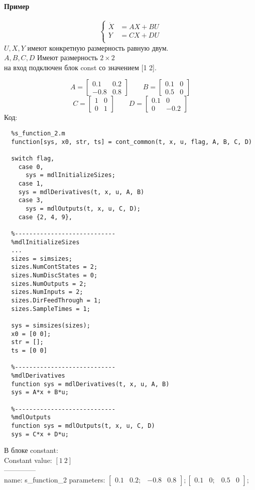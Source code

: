 \paragraph{Пример}\mbox{}\par
\[
  \left\{\begin{aligned} 
    \dot X &= AX + BU \\
    Y &= CX + DU \\
  \end{aligned}\right. 
\] 
$U, X, Y$ имеют конкретную размерность равную двум.\\
$A, B, C, D$ Имеют размерность $2 \times 2$ \\
на вход подключен блок const со значением [1 2].
\begin{figure}
  \centering
\end{figure}
\[
  A = \begin{bmatrix} 0.1 & 0.2 \\ -0.8 & 0.8 \end{bmatrix} \qquad
  B =\begin{bmatrix} 0.1 & 0 \\ 0.5 & 0 \end{bmatrix} 
\] 
\[
  C = \begin{bmatrix} 1 & 0 \\ 0 & 1  \end{bmatrix} \qquad
  D = \begin{bmatrix} 0.1 & 0 \\ 0 & -0.2 \end{bmatrix} 
\] 
Код:
\begin{verbatim}
  %s_function_2.m
  function[sys, x0, str, ts] = cont_common(t, x, u, flag, A, B, C, D)

  switch flag,
    case 0,
      sys = mdlInitializeSizes;
    case 1,
    sys = mdlDerivatives(t, x, u, A, B)
    case 3,
      sys = mdlOutputs(t, x, u, C, D);
    case {2, 4, 9},

  %----------------------------
  %mdlInitializeSizes
  ...
  sizes = simsizes;
  sizes.NumContStates = 2;
  sizes.NumDiscStates = 0;
  sizes.NumOutputs = 2;
  sizes.NumInputs = 2;
  sizes.DirFeedThrough = 1;
  sizes.SampleTimes = 1;

  sys = simsizes(sizes);
  x0 = [0 0];
  str = [];
  ts = [0 0]

  %----------------------------
  %mdlDerivatives
  function sys = mdlDerivatives(t, x, u, A, B)
  sys = A*x + B*u;

  %----------------------------
  %mdlOutputs
  function sys = mdlOutputs(t, x, u, C, D)
  sys = C*x + D*u;
\end{verbatim}
В блоке constant:\\
Constant value: $[1\ 2]$\\
--------------\\
name: s\_function\_2
parameters: $\begin{bmatrix}0.1 & 0.2; & -0.8 & 0.8 \end{bmatrix};
\begin{bmatrix} 0.1 & 0; & 0.5 & 0 \end{bmatrix};$ 
